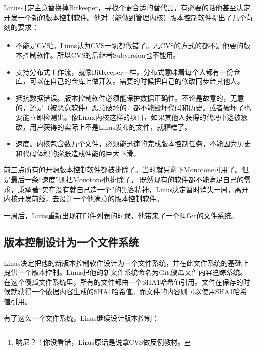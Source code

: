Linus打定主意替换掉Bitkeeper，寻找个更合适的替代品，有必要的话他甚至决定开发一个新的版本控制软件。他对（能做到管理内核）版本控制软件提出了几个苛刻的要求：

\begin{itemize}
\item 不能是CVS\footnote{呐尼？！你没看错，Linus原话是说拿CVS做反例教材。}。Linus认为CVS一切都做错了。凡CVS的方式的都不是他要的版本控制软件。所以CVS的后继者Subversion也不能用。
\item 支持分布式工作流，就像BitKeeper一样。分布式意味着每个人都有一份仓库，可以在自己的仓库上做开发。需要的时候把自己的修改同步给其他人。

\item 抵抗数据错误。版本控制软件必须能保护数据正确性。不论是故意的，无意的，还是（被恶意软件）恶意破坏的，都不能毁坏代码和历史。或者破坏了也要能立即检测出。像Linux内核这样的项目，如果其他人获得的代码中途被篡改，用户获得的实际上不是Linus发布的文件，就糟糕了。

\item 速度。内核包含数万个文件，必须能迅速的完成版本控制任务，不能因为历史和代码体积的膨胀造成性能的巨大下滑。

\end{itemize}

前三点所有的开源版本控制软件都被排除了。当时就只剩下Monotone可用了。但是最后一条“速度”则把Monotone也排除了。
既然现有的软件都不能满足自己的需求，秉承著“实在没有就自己造一个”的黑客精神，Linus决定暂时消失一周，离开内核开发前线，去设计一个他满意的版本控制软件。

一周后，Linus重新出现在邮件列表的时候，他带来了一个叫Git的文件系统。

\subsection{版本控制设计为一个文件系统}

Linus决定把他的新版本控制软件设计为一个文件系统，并在此文件系统的基础上提供一个版本控制。Linus把他的新文件系统命名为Git,傻瓜文件内容追踪系统。
在这个傻瓜文件系统里，所有的文件都由一个SHA1哈希值引用。文件在保存的时候就获得一个依据内容生成的SHA1哈希值。而文件的内容则可以使用SHA1哈希值引用。

有了这么一个文件系统，Linus继续设计版本控制：

